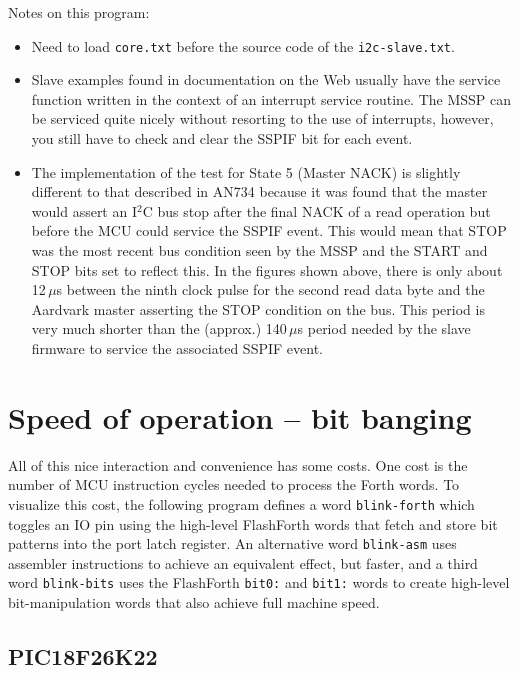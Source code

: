 \documentclass[12pt,a4paper]{article}
\begin{document}
\medskip
\noindent
Notes on this program:
\begin{itemize}
  \item Need to load \texttt{core.txt} before the source code of the \texttt{i2c-slave.txt}.
  \item Slave examples found in documentation on the Web usually have the service function
    written in the context of an interrupt service routine.
    The MSSP can be serviced quite nicely without resorting to the use of interrupts,
    however, you still have to check and clear the SSPIF bit for each event.
  \item The implementation of the test for State 5 (Master NACK) is slightly
    different to that described in AN734 because it was found that the master
    would assert an I$^2$C bus stop after the final NACK of a read operation
    but before the MCU could service the SSPIF event.
    This would mean that STOP was the most recent bus condition seen
    by the MSSP and the START and STOP bits set to reflect this.
    In the figures shown above, there is only about 12\,$\mu$s between the ninth
    clock pulse for the second read data byte and the Aardvark master asserting 
    the STOP condition on the bus.
    This period is very much shorter than the (approx.) 140\,$\mu$s period 
    needed by the slave firmware to service the associated SSPIF event.
\end{itemize}


\newpage
\section{Speed of operation -- bit banging}
%
All of this nice interaction and convenience has some costs.
One cost is the number of MCU instruction cycles needed to process
the Forth words.
To visualize this cost, the following program defines a word \verb!blink-forth! which
toggles an IO pin using the high-level FlashForth words that fetch and store bit patterns into the
port latch register.
An alternative word \verb!blink-asm! uses assembler instructions to achieve an equivalent effect, but faster,
and a third word \verb!blink-bits! uses the FlashForth \verb!bit0:! and \verb!bit1:! words
to create high-level bit-manipulation words that also achieve full machine speed.

\subsection{PIC18F26K22}
%
\end{document}
